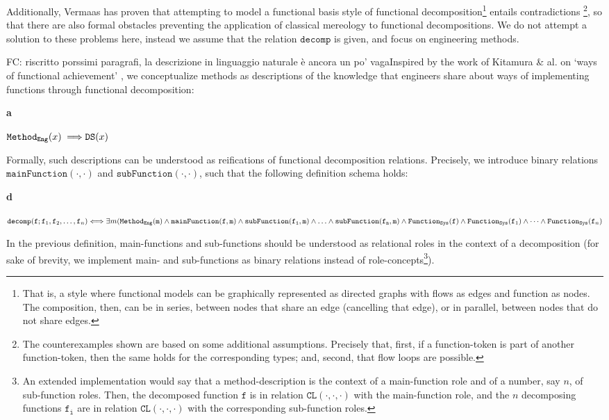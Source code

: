 \documentclass[sw]{iosart2x}
\newcommand{\bflist}{\begin{list}{}{\setlength{\topsep}{2mm}\setlength{\partopsep}{0mm}\setlength{\parsep}{0mm}\setlength{\leftmargin}{9mm}\setlength{\labelwidth}{8mm}}}
\newcommand{\eflist}{\end{list}}
\newcommand{\AxLabel}{\textrm{a}}
\newcommand{\DefLabel}{\textrm{d}}
\newcounter{cntax}
\newcommand{\myax}[1]{\refstepcounter{cntax}\begin{small}{\bf \AxLabel\thecntax\label{ax:#1}}\end{small}}
\newcounter{cntdef}
\newcommand{\mydf}[1]{\refstepcounter{cntdef}\begin{small}{\bf \DefLabel\thecntdef\label{def:#1}}\end{small}}
\newcommand{\generalStyle}[1]{\texttt{#1}}
\newcommand{\biRel}[3]{\generalStyle{#1}(#2,#3)}
\newcommand{\uniRel}[2]{\generalStyle{#1}(#2)}
\newcommand{\uniRelPar}[3]{\generalStyle{#1}_{\generalStyle{#3}}(#2)}
\newcommand{\triRel}[4]{\generalStyle{#1}(#2,#3,#4)}
\newcommand{\cst}[1]{\ensuremath{\mathtt{#1}}}
\newcommand{\myiff}{\Longleftrightarrow}
\newcommand{\myfi}{\hspace{0.9mm} \Longrightarrow}
\newcommand{\DOLCEDescription}[1]{\uniRel{{DS}}{#1}}
\newcommand{\DOLCENASO}[1]{\uniRel{{NASO}}{#1}}
\newcommand{\DOLCECLby}[3]{\triRel{CL}{#1}{#2}{#3}}
\newcommand{\Method}[1]{\uniRelPar{Method}{#1}{Eng}}
\newcommand{\FunctionSys}[1]{\uniRelPar{Function}{#1}{Sys}}
\newcommand{\mainFunction}[2]{\biRel{mainFunction}{#1}{#2}}
\newcommand{\subFunction}[2]{\biRel{subFunction}{#1}{#2}}
\newcommand{\decom}{\generalStyle{decomp}}
\newcommand{\TODO}[1]{{\color{red} #1}}
\begin{document}
Additionally, Vermaas has proven that attempting to model a functional basis style of functional decomposition\footnote{That is, a style where functional models can be graphically represented as directed graphs with flows as edges and function as nodes. The composition, then, can be in series, between nodes that share an edge (cancelling that edge), or in parallel, between nodes that do not share edges.} entails contradictions \cite{vermaasFormalImpossibilityAnalysing2013}\footnote{The counterexamples shown are based on some additional assumptions. Precisely that, first, if a function-token is part of another function-token, then the same holds for the corresponding types; and, second, that flow loops are possible. %
}, so that there are also formal obstacles preventing the application of classical mereology to functional decompositions.
We do not attempt a solution to these problems here,
instead we assume that the relation $\decom$ is given, and focus on engineering methods. %

\TODO{FC: riscritto porssimi paragrafi, la descrizione in linguaggio naturale è ancora un po' vaga}Inspired by the work of Kitamura \& al. on `ways of functional achievement' \cite{kitamuraOntologicalModelDevice2006, kitamuraOntologybasedDescriptionFunctional2003}, we conceptualize methods as descriptions  of the knowledge that engineers share about ways of implementing functions through functional decomposition:
\bflist
  \item[\myax{methodSubs}] $ \Method{x} \myfi \DOLCEDescription{x}$%
\eflist
Formally, such descriptions can be understood as reifications of functional decomposition relations.
Precisely, we introduce binary relations $\mainFunction{\cdot}{\cdot}$ and $\subFunction{\cdot}{\cdot}$, such that the following definition schema holds:
\bflist
  \item[\mydf{method}] $\decom(\cst{f};\cst{f}_1,\cst{f}_2,\dots,\cst{f}_n) \myiff \\ \exists m (\Method{\cst{m}} \land \mainFunction{\cst{f}}{\cst{m}} \land \subFunction{\cst{f_1}}{\cst{m}} \land \ldots \land \subFunction{\cst{f_n}}{\cst{m}} \land \FunctionSys{\cst{f}} \land \FunctionSys{\cst{f}_1} \land \dots \land \FunctionSys{\cst{f}_n}
 $
\eflist
In the previous definition, main-functions and sub-functions should be understood as relational roles in the context of a decomposition (for sake of brevity, we implement main- and sub-functions as binary relations instead of role-concepts\footnote{An extended implementation would say that a method-description is the context of a main-function role and of a number, say $n$, of sub-function roles. Then, the decomposed function $\cst{f}$ is in relation $\DOLCECLby{\cdot}{\cdot}{\cdot}$ with the main-function role, and the $n$ decomposing functions $\cst{f_i}$ are in relation $\DOLCECLby{\cdot}{\cdot}{\cdot}$ with the corresponding sub-function roles.}).
\end{document}
